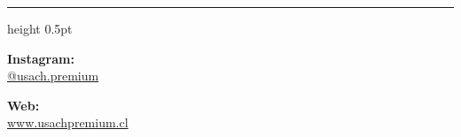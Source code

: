 \documentclass[letterpaper, 12pt]{article}
\begin{document}
\vspace{2.5cm}
\begin{center}
    \color{azulFuerte}\hrule height 0.5pt
    \vspace{0.3cm}
    \begin{minipage}{0.45\textwidth}
        \centering
        \textbf{Instagram:} \\ 
        
        \small \href{https://www.instagram.com/usach.premium/}{@usach.premium}
    \end{minipage}
    \begin{minipage}{0.45\textwidth}
        \centering
        \textbf{Web:} \\ 
        \small \href{http://www.usachpremium.cl}{www.usachpremium.cl}
    \end{minipage}
\end{center}



\end{document}
